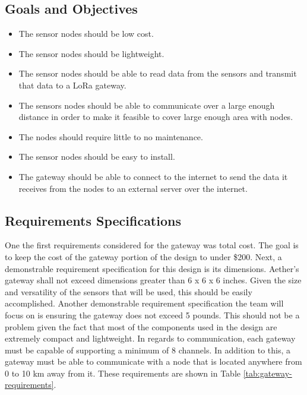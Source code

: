 \subsection{Goals and Objectives}
\begin{itemize}
    \item The sensor nodes should be low cost.
    \item The sensor nodes should be lightweight.
    \item The sensor nodes should be able to read data from the sensors and transmit that data to a LoRa gateway.
    \item The sensors nodes should be able to communicate over a large enough distance in order to make it feasible to cover large enough area with nodes.
    \item The nodes should require little to no maintenance.
    \item The sensor nodes should be easy to install.
    \item The gateway should be able to connect to the internet to send the data it receives from the nodes to an external server over the internet.
\end{itemize}


\subsection{Requirements Specifications}
One the first requirements considered for the gateway was total cost. The goal is to keep the cost of the gateway portion of the design to under \$200. Next, a demonstrable requirement specification for this design is its dimensions. Aether’s gateway shall not exceed dimensions greater than 6 x 6 x 6 inches. Given the size and versatility of the sensors that will be used, this should be easily accomplished. Another demonstrable requirement specification the team will focus on is ensuring the gateway does not exceed 5 pounds. This should not be a problem given the fact that most of the components used in the design are extremely compact and lightweight. In regards to communication, each gateway must be capable of supporting a minimum of 8 channels. In addition to this, a gateway must be able to communicate with a node that is located anywhere from 0 to 10 km away from it. These requirements are shown in Table \ref{tab:gateway-requirements}.

